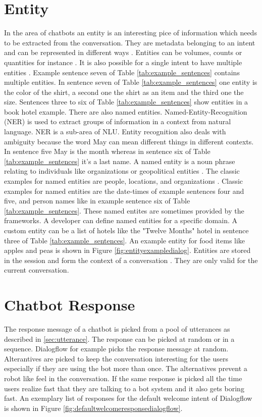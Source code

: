 \section{Entity} \label{sec:entity}
In the area of chatbots an entity is an interesting pice of information which needs to be 
extracted from the conversation.
They are metadata belonging to an intent and can be represented in different ways \cite{buiildChatbotsPython}.
Entities can be volumes, counts or quantities for instance \cite{buiildChatbotsPython}.
It is also possible for a single intent to have multiple entities \cite{buiildChatbotsPython}.
Example sentence seven of Table \ref{tab:example_sentences} contains multiple entities.
In sentence seven of Table \ref{tab:example_sentences} one entity is the color of the shirt, 
a second one the shirt as an item and the third one the size.
Sentences three to six of Table \ref{tab:example_sentences} show entities in a book hotel example.
There are also named entities.
Named-Entity-Recognition (NER) is used to extract groups of information in a context from natural language.
NER is a sub-area of NLU.
Entity recognition also deals with ambiguity because the word May can mean different things in different contexts.
In sentence five May is the month whereas in sentence six of Table \ref{tab:example_sentences} it's a last name. 
A named entity is a noun phrase relating to individuals like organizations or geopolitical entities \cite{singhbuilding}.
The classic examples for named entities are people, locations, and organizations \cite{geyer2016named}.
Classic examples for named entities are the date-times of example sentences four and five,
and person names like in example sentence six of Table \ref{tab:example_sentences}.
These named entites are sometimes provided by the frameworks.
A developer can define named entities for a specific domain.
A custom entity can be a list of hotels like the "Twelve Months" 
hotel in sentence three of Table \ref{tab:example_sentences}.
An example entity for food items like apples and peas is shown in Figure \ref{fig:entityexampledialog}.
Entities are stored in the session and form the context of a conversation \cite{singhbuilding}.
They are only valid for the current conversation.


\section{Chatbot Response} \label{sec:chatbot_response}
The response message of a chatbot is picked from a pool of utterances as described in \ref{sec:utterance}.
The response can be picked at random or in a sequence.
Dialogflow for example picks the response message at random.
Alterantives are picked to keep the conversation interesting for the users especially
if they are using the bot more than once.
The alternatives prevent a robot like feel in the conversation. 
If the same response is picked all the time users realize fast that they are 
talking to a bot system and it also gets boring fast. 
An exemplary list of responses for the default welcome intent of Dialogflow is shown in Figure \ref{fig:defaultwelcomeresponsedialogflow}.

